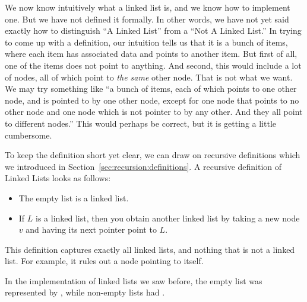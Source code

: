 We now know intuitively what a linked list is, and we know how to
implement one. But we have not defined it formally.
In other words, we have not yet said exactly how to distinguish 
``A Linked List'' from a ``Not A Linked List.''
In trying to come up with a definition,
our intuition tells us that it is a bunch of items,
where each item has associated data and points to another item.
But first of all, one of the items does not point to anything.
And second, this would include a lot of nodes,
all of which point to \emph{the same} other node.
That is not what we want.
We may try something like ``a bunch of items, each of which points to
one other node, and is pointed to by one other node,
except for one node that points to no other node and one node which is
not pointer to by any other. And they all point to different nodes.''
This would perhaps be correct, but it is getting a little cumbersome.

To keep the definition short yet clear,
we can draw on recursive definitions which we introduced in
Section~\ref{sec:recursion:definitions}.
A recursive definition of Linked Lists looks as follows:

\begin{itemize}
\item The empty list is a linked list.
\item If $L$ is a linked list, then you obtain another linked list by
  taking a new node $v$ and having its next pointer point to $L$.
\end{itemize}

This definition captures exactly all linked lists,
and nothing that is not a linked list.
For example, it rules out a node pointing to itself.

In the implementation of linked lists we saw before,
the empty list was represented by ,
while non-empty lists had .
